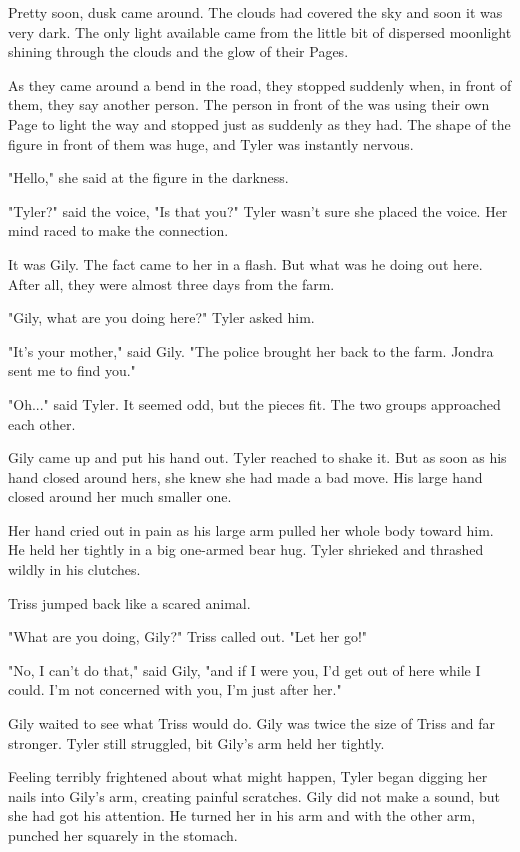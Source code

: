 \documentclass[courier]{sffms}
\begin{document}
Pretty soon, dusk came around. The clouds had
covered the sky and soon it was very dark. The
only light available came from the little bit of
dispersed moonlight shining through the clouds
and the glow of their Pages.

As they came around a bend in the road, they
stopped suddenly when, in front of them, they
say another person. The person in front of the
was using their own Page to light the way and
stopped just as suddenly as they had.
The shape of the figure in front of them was
huge, and Tyler was instantly nervous.

"Hello," she said at the figure in the darkness.

"Tyler?" said the voice, "Is that you?" Tyler
wasn't sure she placed the voice. Her mind
raced to make the connection.

It was Gily. The fact came to her in a flash. But
what was he doing out here. After all, they were
almost three days from the farm.

"Gily, what are you doing here?" Tyler asked him.

"It's your mother," said Gily. "The police brought
her back to the farm. Jondra sent me to find you."

"Oh..." said Tyler. It seemed odd, but the
pieces fit. The two groups approached each other.

Gily came up and put his hand out. Tyler
reached to shake it. But as soon as his hand closed
around hers, she knew she had made a bad move.
His large hand closed around her much smaller one.

Her hand cried out in pain as his large arm pulled
her whole body toward him. He held her tightly in
a big one-armed bear hug. Tyler shrieked and thrashed
wildly in his clutches.

Triss jumped back like a scared animal.

"What are you doing, Gily?" Triss called out. "Let
her go!"

"No, I can't do that," said Gily, "and if I were you,
I'd get out of here while I could. I'm not concerned
with you, I'm just after her."

Gily waited to see what Triss would do. Gily was twice
the size of Triss and far stronger. Tyler still struggled,
bit Gily's arm held her tightly.

Feeling terribly frightened
about what might happen, Tyler began digging her
nails into Gily's arm, creating painful scratches. Gily
did not make a sound, but she had got his attention.
He turned her in his arm and with the other arm,
punched her squarely in the stomach.
\end{document}
